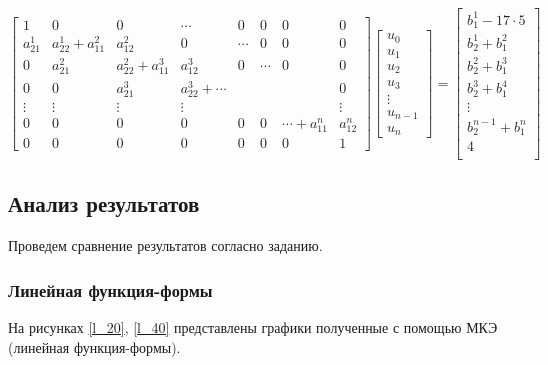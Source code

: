 $$
\begin{bmatrix}
1     &   0        &   0 & \cdots & 0 & 0 & 0  & 0\\
a_{21}^1     &    a_{22}^1+a_{11}^2 & a_{12}^2  & 0 & \cdots & 0 & 0  & 0\\
0     &    a_{21}^2 & a_{22}^2+a_{11}^3  &  a_{12}^3  & 0 & \cdots & 0  & 0\\
0     &    0  & a_{21}^3  & a_{22}^3+ \cdots  &  & &   & 0\\
\vdots & \vdots & \vdots & \vdots &  &  &   & \vdots\\
0 & 0 & 0 & 0 &  0 & 0 & \cdots+a_{11}^n  & a_{12}^n\\
0 & 0 & 0 & 0 &  0 & 0 & 0 & 1
\end{bmatrix}
\begin{bmatrix}
u_0 \\
u_1 \\
u_2\\
u_3\\
\vdots\\
u_{n-1}\\
u_n
\end{bmatrix} =
\begin{bmatrix}
 b_1^1   -17  \cdot 5   \\
b_2^1+b_1^2\\
b_2^2+b_1^3\\
b_2^3+b_1^4\\
\vdots\\
b_2^{n-1}+b_1^n\\
 4   \\
\end{bmatrix}
$$

\subsection{Анализ результатов}

Проведем сравнение результатов согласно заданию.

\subsubsection{Линейная функция-формы}


На рисунках \ref{l_20}, \ref{l_40} представлены графики полученные с помощью МКЭ (линейная функция-формы).

